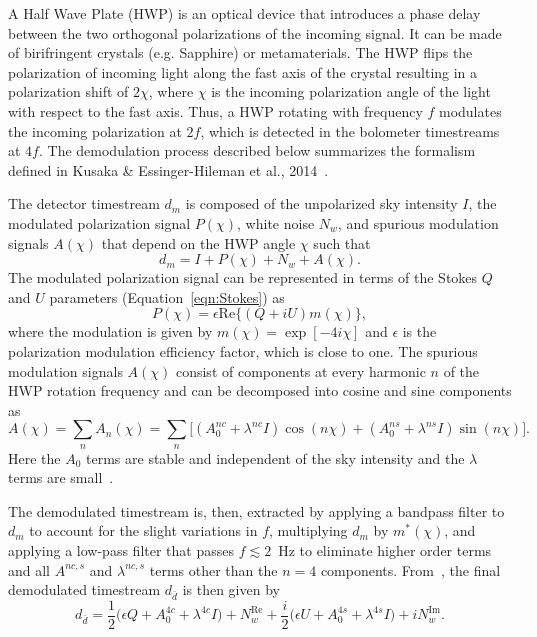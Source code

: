 A Half Wave Plate (HWP) is an optical device that introduces a phase delay between the two orthogonal polarizations of the incoming signal. It can be made of birifringent crystals (e.g. Sapphire) or metamaterials. The HWP flips the polarization of incoming light along the fast axis of the crystal resulting in a polarization shift of $2\chi$, where $\chi$ is the incoming polarization angle of the light with respect to the fast axis. Thus, a HWP rotating with frequency $f$ modulates the incoming polarization at $2f$, which is detected in the bolometer timestreams at $4f$. The demodulation process described below summarizes the formalism defined in Kusaka \& Essinger-Hileman et al., 2014~\cite{ABS_HWP}.

The detector timestream $d_{m}$ is composed of the unpolarized sky intensity $I$, the modulated polarization signal $P(\chi)$, white noise $N_{w}$, and spurious modulation signals $A(\chi)$ that depend on the HWP angle $\chi$ such that
\begin{equation}
d_{m}= I + P(\chi)+ N_{w} + A(\chi).
\end{equation}
The modulated polarization signal can be represented in terms of the Stokes $Q$ and $U$ parameters (Equation~\ref{eqn:Stokes}) as
\begin{equation}
P(\chi)=\epsilon \mathrm{Re}\{(Q+iU) m(\chi)\},
\end{equation}
where the modulation is given by $m(\chi)=\exp[-4 i \chi]$ and $\epsilon$ is the polarization modulation efficiency factor, which is close to one. The spurious modulation signals $A(\chi)$ consist of components at every harmonic $n$ of the HWP rotation frequency and can be decomposed into cosine and sine components as
\begin{equation}\label{eqn:achi}
A(\chi)= \sum_{n} A_n(\chi)=\sum_{n}\Big[ (A^{nc}_{0} + \lambda^{nc} I) \cos(n\chi) + (A^{ns}_{0} + \lambda^{ns} I) \sin(n\chi)    \Big].
\end{equation}
Here the $A_{0}$ terms are stable and independent of the sky intensity and the $\lambda$ terms are small~\cite{ABS_HWP}.

The demodulated timestream is, then, extracted by applying a bandpass filter to $d_{m}$ to account for the slight variations in $f$, multiplying $d_{m}$ by $m^*(\chi)$, and applying a low-pass filter that passes $f\lesssim2$~Hz to eliminate higher order terms and all $A^{nc,s}$ and $\lambda^{nc,s}$ terms other than the $n=4$ components. From~\cite{ABS_HWP}, the final demodulated timestream $d_{\bar{d}}$ is then given by
\begin{equation}
d_{\bar{d}}=\frac{1}{2}\Big(\epsilon Q + A^{4c}_{0} + \lambda^{4c} I \Big) + N^{\mathrm{Re}}_{w} + \frac{i}{2}\Big(\epsilon U + A^{4s}_{0} + \lambda^{4s} I \Big) + iN^{\mathrm{Im}}_{w}.
\end{equation}


